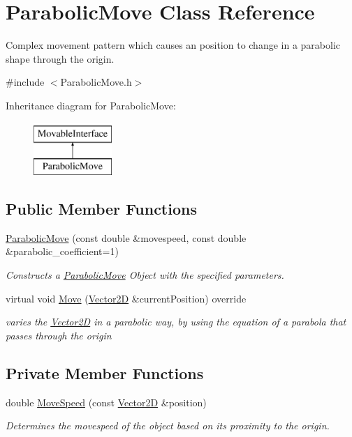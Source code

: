 \hypertarget{class_parabolic_move}{}\section{Parabolic\+Move Class Reference}
\label{class_parabolic_move}


Complex movement pattern which causes an position to change in a parabolic shape through the origin.  




{\ttfamily \#include $<$Parabolic\+Move.\+h$>$}

Inheritance diagram for Parabolic\+Move\+:\begin{figure}[H]
\begin{center}
\leavevmode
\includegraphics[height=2.000000cm]{d3/da6/class_parabolic_move}
\end{center}
\end{figure}
\subsection*{Public Member Functions}
\begin{DoxyCompactItemize}
\item 
\hyperlink{class_parabolic_move_abf12528c6594cbdcec66dba3239acdff}{Parabolic\+Move} (const double \&movespeed, const double \&parabolic\+\_\+coefficient=1)
\begin{DoxyCompactList}\small\item\em Constructs a \hyperlink{class_parabolic_move}{Parabolic\+Move} Object with the specified parameters. \end{DoxyCompactList}\item 
virtual void \hyperlink{class_parabolic_move_a577831644247ca57aa1c2c88843c779b}{Move} (\hyperlink{class_vector2_d}{Vector2D} \&current\+Position) override
\begin{DoxyCompactList}\small\item\em varies the \hyperlink{class_vector2_d}{Vector2D} in a parabolic way, by using the equation of a parabola that passes through the origin \end{DoxyCompactList}\end{DoxyCompactItemize}
\subsection*{Private Member Functions}
\begin{DoxyCompactItemize}
\item 
double \hyperlink{class_parabolic_move_a1fde73a6298c970648344e0e232659d5}{Move\+Speed} (const \hyperlink{class_vector2_d}{Vector2D} \&position)
\begin{DoxyCompactList}\small\item\em Determines the movespeed of the object based on its proximity to the origin. \end{DoxyCompactList}\end{DoxyCompactItemize}
